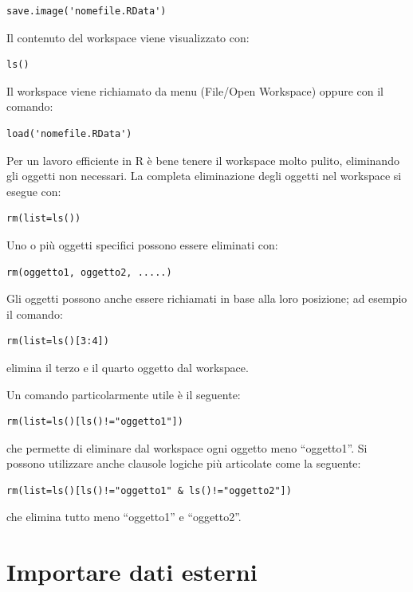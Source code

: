 \documentclass[
  12pt,
]{book}
\begin{document}
\begin{verbatim}
save.image('nomefile.RData')
\end{verbatim}

Il contenuto del workspace viene visualizzato con:

\begin{verbatim}
ls()
\end{verbatim}

Il workspace viene richiamato da menu (File/Open Workspace) oppure con il comando:

\begin{verbatim}
load('nomefile.RData')
\end{verbatim}

Per un lavoro efficiente in R è bene tenere il workspace molto pulito, eliminando gli oggetti non necessari. La completa eliminazione degli oggetti nel workspace si esegue con:

\begin{verbatim}
rm(list=ls())
\end{verbatim}

Uno o più oggetti specifici possono essere eliminati con:

\begin{verbatim}
rm(oggetto1, oggetto2, .....)
\end{verbatim}

Gli oggetti possono anche essere richiamati in base alla loro posizione; ad esempio il comando:

\begin{verbatim}
rm(list=ls()[3:4])
\end{verbatim}

elimina il terzo e il quarto oggetto dal workspace.

Un comando particolarmente utile è il seguente:

\begin{verbatim}
rm(list=ls()[ls()!="oggetto1"])
\end{verbatim}

che permette di eliminare dal workspace ogni oggetto meno ``oggetto1''. Si possono utilizzare anche clausole logiche più articolate come la seguente:

\begin{verbatim}
rm(list=ls()[ls()!="oggetto1" & ls()!="oggetto2"])
\end{verbatim}

che elimina tutto meno ``oggetto1'' e ``oggetto2''.

\hypertarget{importare-dati-esterni}{%
\section{Importare dati esterni}\label{importare-dati-esterni}}
\end{document}
